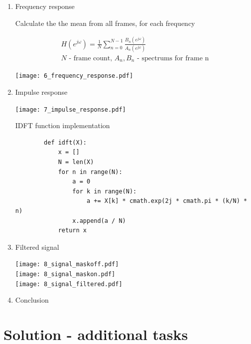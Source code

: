 \documentclass[a4paper, 11pt]{article}
\begin{document}
\begin{enumerate}
        \item
        Frequency response

        Calculate the the mean from all frames, for each frequency

        \begin{gather*}
            H(e^{j\omega}) = \frac{1}{N} \sum_{n=0}^{N-1} \frac{ B_n(e^{j\omega}) }{ A_n(e^{j\omega}) } \\
            N \text{ - frame count, } A_n, B_n \text{ - spectrums for frame n}
        \end{gather*}

        \texttt{[image: 6\_frequency\_response.pdf]}

        \item
        Impulse response

        \texttt{[image: 7\_impulse\_response.pdf]}

        IDFT function implementation

		\begin{verbatim}
		def idft(X):
			x = []
			N = len(X)
			for n in range(N):
				a = 0
				for k in range(N):
					a += X[k] * cmath.exp(2j * cmath.pi * (k/N) * n)
				x.append(a / N)
			return x
		\end{verbatim}

        \newpage

        \item
        Filtered signal

        \texttt{[image: 8\_signal\_maskoff.pdf]} \\
        \texttt{[image: 8\_signal\_maskon.pdf]} \\
        \texttt{[image: 8\_signal\_filtered.pdf]}

        \item
        Conclusion

    \end{enumerate}

    \newpage
    \section*{Solution - additional tasks}
\end{document}
